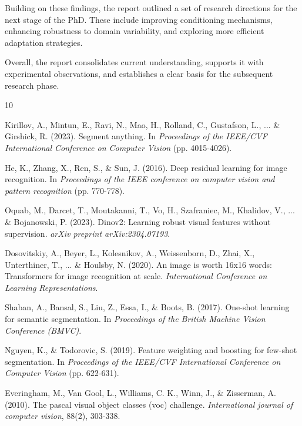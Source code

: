 \documentclass[journal,12pt,onecolumn,draftclsnofoot]{IEEEtran}
\begin{document}
Building on these findings, the report outlined a set of research directions for the next stage of the PhD. These include improving conditioning mechanisms, enhancing robustness to domain variability, and exploring more efficient adaptation strategies.  

Overall, the report consolidates current understanding, supports it with experimental observations, and establishes a clear basis for the subsequent research phase.

\newpage


\begin{thebibliography}{10}

Kirillov, A., Mintun, E., Ravi, N., Mao, H., Rolland, C., Gustafson, L., ... \& Girshick, R. (2023). Segment anything. In \textit{Proceedings of the IEEE/CVF International Conference on Computer Vision} (pp. 4015-4026).

He, K., Zhang, X., Ren, S., \& Sun, J. (2016). Deep residual learning for image recognition. In \textit{Proceedings of the IEEE conference on computer vision and pattern recognition} (pp. 770-778).

Oquab, M., Darcet, T., Moutakanni, T., Vo, H., Szafraniec, M., Khalidov, V., ... \& Bojanowski, P. (2023). Dinov2: Learning robust visual features without supervision. \textit{arXiv preprint arXiv:2304.07193}.

Dosovitskiy, A., Beyer, L., Kolesnikov, A., Weissenborn, D., Zhai, X., Unterthiner, T., ... \& Houlsby, N. (2020). An image is worth 16x16 words: Transformers for image recognition at scale. \textit{International Conference on Learning Representations}.

Shaban, A., Bansal, S., Liu, Z., Essa, I., \& Boots, B. (2017). One-shot learning for semantic segmentation. In \textit{Proceedings of the British Machine Vision Conference (BMVC)}.

Nguyen, K., \& Todorovic, S. (2019). Feature weighting and boosting for few-shot segmentation. In \textit{Proceedings of the IEEE/CVF International Conference on Computer Vision} (pp. 622-631).

Everingham, M., Van Gool, L., Williams, C. K., Winn, J., \& Zisserman, A. (2010). The pascal visual object classes (voc) challenge. \textit{International journal of computer vision}, 88(2), 303-338.


\end{thebibliography}
\end{document}

